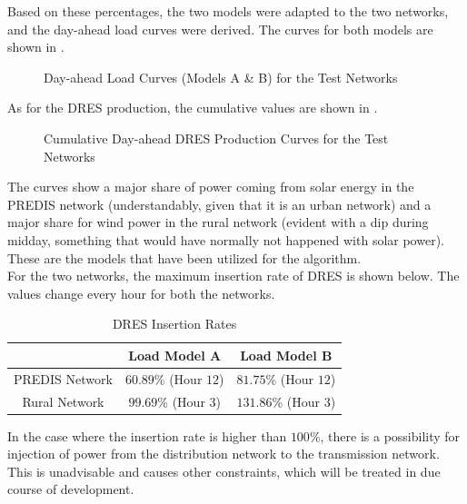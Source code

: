 Based on these percentages, the two models were adapted to the two networks, and the day-ahead load curves were derived. The curves for both models are shown in .\\

\begin{figure}[!h]
\begin{minipage}[!h]{.5\textwidth}
	\centering
    \setlength\figureheight{5cm}
    \setlength\figurewidth{6cm}
	
\end{minipage}
\begin{minipage}[!h]{.5\textwidth}
	\centering
	\setlength\figureheight{5cm}
    \setlength\figurewidth{6cm}
	
\end{minipage}
\caption{Day-ahead Load Curves (Models A \& B) for the Test Networks}
\end{figure}

As for the DRES production, the cumulative values are shown in .\\

\begin{figure}[!h]
\begin{minipage}[!h]{.5\textwidth}
	\centering
    \setlength\figureheight{5cm}
    \setlength\figurewidth{6cm}
	
\end{minipage}
\begin{minipage}[!h]{.5\textwidth}
	\centering
	\setlength\figureheight{5cm}
    \setlength\figurewidth{6cm}
	
\end{minipage}
\caption{Cumulative Day-ahead DRES Production Curves for the Test Networks}
\end{figure}

The curves show a major share of power coming from solar energy in the PREDIS network (understandably, given that it is an urban network) and a major share for wind power in the rural network (evident with a dip during midday, something that would have normally not happened with solar power). These are the models that have been utilized for the algorithm.\\

For the two networks, the maximum insertion rate of DRES is shown below. The values change every hour for both the networks.

\begin{table}[h]
\centering
\begin{tabular}{ccc}
\rowcolor{gray!25}
& \textbf{Load Model A} & \textbf{Load Model B}\\
\hline
PREDIS Network & $60.89$\% (Hour $12$) & $81.75$\% (Hour $12$) \\
\rowcolor{gray!15}
Rural Network & $99.69$\% (Hour $3$) & $131.86$\% (Hour $3$) \\
\hline
\end{tabular}
\caption{DRES Insertion Rates}
\end{table}

In the case where the insertion rate is higher than $100$\%, there is a possibility for injection of power from the distribution network to the transmission network. This is unadvisable and causes other constraints, which will be treated in due course of development.


